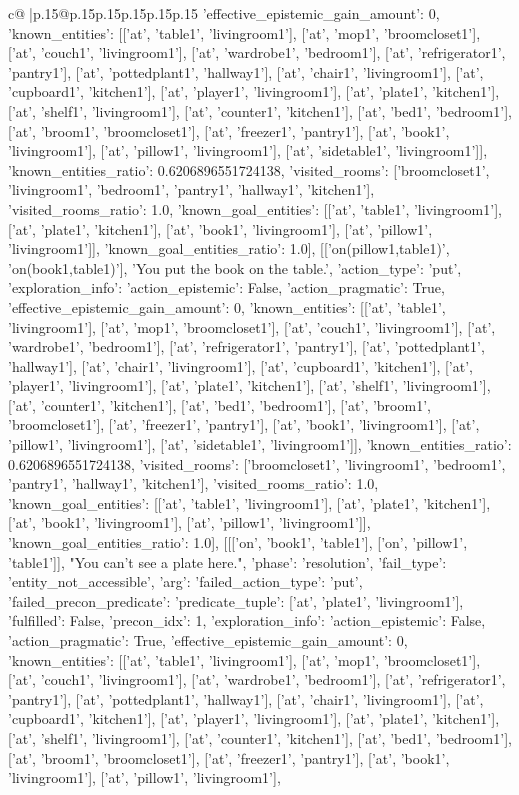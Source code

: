 \documentclass{article}
\begin{document}
{\begin{supertabular}{c@{$\;$}|p{.15\linewidth}@{}p{.15\linewidth}p{.15\linewidth}p{.15\linewidth}p{.15\linewidth}p{.15\linewidth}}
{{{'effective_epistemic_gain_amount': 0, 'known_entities': [['at', 'table1', 'livingroom1'], ['at', 'mop1', 'broomcloset1'], ['at', 'couch1', 'livingroom1'], ['at', 'wardrobe1', 'bedroom1'], ['at', 'refrigerator1', 'pantry1'], ['at', 'pottedplant1', 'hallway1'], ['at', 'chair1', 'livingroom1'], ['at', 'cupboard1', 'kitchen1'], ['at', 'player1', 'livingroom1'], ['at', 'plate1', 'kitchen1'], ['at', 'shelf1', 'livingroom1'], ['at', 'counter1', 'kitchen1'], ['at', 'bed1', 'bedroom1'], ['at', 'broom1', 'broomcloset1'], ['at', 'freezer1', 'pantry1'], ['at', 'book1', 'livingroom1'], ['at', 'pillow1', 'livingroom1'], ['at', 'sidetable1', 'livingroom1']], 'known_entities_ratio': 0.6206896551724138, 'visited_rooms': ['broomcloset1', 'livingroom1', 'bedroom1', 'pantry1', 'hallway1', 'kitchen1'], 'visited_rooms_ratio': 1.0, 'known_goal_entities': [['at', 'table1', 'livingroom1'], ['at', 'plate1', 'kitchen1'], ['at', 'book1', 'livingroom1'], ['at', 'pillow1', 'livingroom1']], 'known_goal_entities_ratio': 1.0}}], [['on(pillow1,table1)', 'on(book1,table1)'], 'You put the book on the table.', {'action_type': 'put', 'exploration_info': {'action_epistemic': False, 'action_pragmatic': True, 'effective_epistemic_gain_amount': 0, 'known_entities': [['at', 'table1', 'livingroom1'], ['at', 'mop1', 'broomcloset1'], ['at', 'couch1', 'livingroom1'], ['at', 'wardrobe1', 'bedroom1'], ['at', 'refrigerator1', 'pantry1'], ['at', 'pottedplant1', 'hallway1'], ['at', 'chair1', 'livingroom1'], ['at', 'cupboard1', 'kitchen1'], ['at', 'player1', 'livingroom1'], ['at', 'plate1', 'kitchen1'], ['at', 'shelf1', 'livingroom1'], ['at', 'counter1', 'kitchen1'], ['at', 'bed1', 'bedroom1'], ['at', 'broom1', 'broomcloset1'], ['at', 'freezer1', 'pantry1'], ['at', 'book1', 'livingroom1'], ['at', 'pillow1', 'livingroom1'], ['at', 'sidetable1', 'livingroom1']], 'known_entities_ratio': 0.6206896551724138, 'visited_rooms': ['broomcloset1', 'livingroom1', 'bedroom1', 'pantry1', 'hallway1', 'kitchen1'], 'visited_rooms_ratio': 1.0, 'known_goal_entities': [['at', 'table1', 'livingroom1'], ['at', 'plate1', 'kitchen1'], ['at', 'book1', 'livingroom1'], ['at', 'pillow1', 'livingroom1']], 'known_goal_entities_ratio': 1.0}}], [[['on', 'book1', 'table1'], ['on', 'pillow1', 'table1']], "You can't see a plate here.", {'phase': 'resolution', 'fail_type': 'entity_not_accessible', 'arg': {'failed_action_type': 'put', 'failed_precon_predicate': {'predicate_tuple': ['at', 'plate1', 'livingroom1'], 'fulfilled': False, 'precon_idx': 1}}, 'exploration_info': {'action_epistemic': False, 'action_pragmatic': True, 'effective_epistemic_gain_amount': 0, 'known_entities': [['at', 'table1', 'livingroom1'], ['at', 'mop1', 'broomcloset1'], ['at', 'couch1', 'livingroom1'], ['at', 'wardrobe1', 'bedroom1'], ['at', 'refrigerator1', 'pantry1'], ['at', 'pottedplant1', 'hallway1'], ['at', 'chair1', 'livingroom1'], ['at', 'cupboard1', 'kitchen1'], ['at', 'player1', 'livingroom1'], ['at', 'plate1', 'kitchen1'], ['at', 'shelf1', 'livingroom1'], ['at', 'counter1', 'kitchen1'], ['at', 'bed1', 'bedroom1'], ['at', 'broom1', 'broomcloset1'], ['at', 'freezer1', 'pantry1'], ['at', 'book1', 'livingroom1'], ['at', 'pillow1', 'livingroom1'], }}}
\end{supertabular}}
\end{document}
